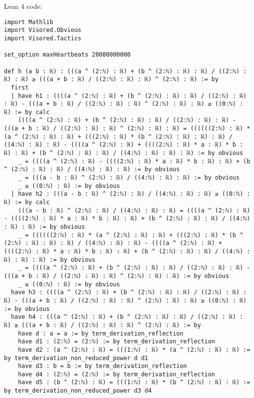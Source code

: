 \documentclass{article}
\begin{document}
Lean 4 code:
\begin{tcolorbox}[colback=white!10, width=\linewidth]
\begin{lstlisting}[language=Lean4]
import Mathlib
import Visored.Obvious
import Visored.Tactics

set_option maxHeartbeats 20000000000

def h (a b : ℝ) : (((a ^ (2:ℕ) : ℝ) + (b ^ (2:ℕ) : ℝ) : ℝ) / ((2:ℕ) : ℝ) : ℝ) ≥ (((a + b : ℝ) / ((2:ℕ) : ℝ) : ℝ) ^ (2:ℕ) : ℝ) := by
  first
  | have h1 : ((((a ^ (2:ℕ) : ℝ) + (b ^ (2:ℕ) : ℝ) : ℝ) / ((2:ℕ) : ℝ) : ℝ) - (((a + b : ℝ) / ((2:ℕ) : ℝ) : ℝ) ^ (2:ℕ) : ℝ) : ℝ) ≥ ((0:ℕ) : ℝ) := by calc
    ((((a ^ (2:ℕ) : ℝ) + (b ^ (2:ℕ) : ℝ) : ℝ) / ((2:ℕ) : ℝ) : ℝ) - (((a + b : ℝ) / ((2:ℕ) : ℝ) : ℝ) ^ (2:ℕ) : ℝ) : ℝ) = ((((((2:ℕ) : ℝ) * (a ^ (2:ℕ) : ℝ) : ℝ) + (((2:ℕ) : ℝ) * (b ^ (2:ℕ) : ℝ) : ℝ) : ℝ) / ((4:ℕ) : ℝ) : ℝ) - ((((a ^ (2:ℕ) : ℝ) + ((((2:ℕ) : ℝ) * a : ℝ) * b : ℝ) : ℝ) + (b ^ (2:ℕ) : ℝ) : ℝ) / ((4:ℕ) : ℝ) : ℝ) : ℝ) := by obvious
    _ = ((((a ^ (2:ℕ) : ℝ) - ((((2:ℕ) : ℝ) * a : ℝ) * b : ℝ) : ℝ) + (b ^ (2:ℕ) : ℝ) : ℝ) / ((4:ℕ) : ℝ) : ℝ) := by obvious
    _ = (((a - b : ℝ) ^ (2:ℕ) : ℝ) / ((4:ℕ) : ℝ) : ℝ) := by obvious
    _ ≥ ((0:ℕ) : ℝ) := by obvious
  | have h2 : (((a - b : ℝ) ^ (2:ℕ) : ℝ) / ((4:ℕ) : ℝ) : ℝ) ≥ ((0:ℕ) : ℝ) := by calc
    (((a - b : ℝ) ^ (2:ℕ) : ℝ) / ((4:ℕ) : ℝ) : ℝ) = ((((a ^ (2:ℕ) : ℝ) - ((((2:ℕ) : ℝ) * a : ℝ) * b : ℝ) : ℝ) + (b ^ (2:ℕ) : ℝ) : ℝ) / ((4:ℕ) : ℝ) : ℝ) := by obvious
    _ = ((((((2:ℕ) : ℝ) * (a ^ (2:ℕ) : ℝ) : ℝ) + (((2:ℕ) : ℝ) * (b ^ (2:ℕ) : ℝ) : ℝ) : ℝ) / ((4:ℕ) : ℝ) : ℝ) - ((((a ^ (2:ℕ) : ℝ) + ((((2:ℕ) : ℝ) * a : ℝ) * b : ℝ) : ℝ) + (b ^ (2:ℕ) : ℝ) : ℝ) / ((4:ℕ) : ℝ) : ℝ) : ℝ) := by obvious
    _ = ((((a ^ (2:ℕ) : ℝ) + (b ^ (2:ℕ) : ℝ) : ℝ) / ((2:ℕ) : ℝ) : ℝ) - (((a + b : ℝ) / ((2:ℕ) : ℝ) : ℝ) ^ (2:ℕ) : ℝ) : ℝ) := by obvious
    _ ≥ ((0:ℕ) : ℝ) := by obvious
  have h3 : ((((a ^ (2:ℕ) : ℝ) + (b ^ (2:ℕ) : ℝ) : ℝ) / ((2:ℕ) : ℝ) : ℝ) - (((a + b : ℝ) / ((2:ℕ) : ℝ) : ℝ) ^ (2:ℕ) : ℝ) : ℝ) ≥ ((0:ℕ) : ℝ) := by obvious
  have h4 : (((a ^ (2:ℕ) : ℝ) + (b ^ (2:ℕ) : ℝ) : ℝ) / ((2:ℕ) : ℝ) : ℝ) ≥ (((a + b : ℝ) / ((2:ℕ) : ℝ) : ℝ) ^ (2:ℕ) : ℝ) := by
    have d : a = a := by term_derivation_reflection
    have d1 : (2:ℕ) = (2:ℕ) := by term_derivation_reflection
    have d2 : (a ^ (2:ℕ) : ℝ) = (((1:ℕ) : ℝ) * (a ^ (2:ℕ) : ℝ) : ℝ) := by term_derivation_non_reduced_power d d1
    have d3 : b = b := by term_derivation_reflection
    have d4 : (2:ℕ) = (2:ℕ) := by term_derivation_reflection
    have d5 : (b ^ (2:ℕ) : ℝ) = (((1:ℕ) : ℝ) * (b ^ (2:ℕ) : ℝ) : ℝ) := by term_derivation_non_reduced_power d3 d4

\end{lstlisting}
\end{tcolorbox}
\end{document}
